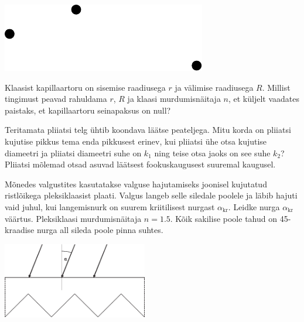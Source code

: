 \documentclass[10pt, twoside]{article}
\begin{document}
{\begin{center}
	\includegraphics[width=0.6\linewidth]{2009-v2g-08-yl}
\end{center}
\probend
\bigskip


Klaasist kapillaartoru on sisemise raadiusega $r$ ja välimise raadiusega $R$. Millist tingimust peavad rahuldama $r$, $R$ ja klaasi murdumisnäitaja $n$, et küljelt vaadates paistaks, et kapillaartoru seinapaksus on null?
\probend
\bigskip


Teritamata pliiatsi telg ühtib koondava läätse peateljega. Mitu korda on pliiatsi kujutise pikkus tema enda pikkusest erinev, kui pliiatsi ühe otsa kujutise diameetri ja pliiatsi diameetri suhe on $k_1$ ning teise otsa jaoks on see suhe $k_2$? Pliiatsi mõlemad otsad asuvad läätsest fookuskaugusest suuremal kaugusel.
\probend
\bigskip


Mõnedes valgustites kasutatakse valguse hajutamiseks joonisel kujutatud ristlõikega
pleksiklaasist plaati. Valgus langeb selle siledale poolele ja läbib hajuti vaid juhul, kui
langemisnurk on suurem kriitilisest nurgast $\alpha_\mathrm{kr}$. Leidke nurga $\alpha_\mathrm{kr}$ väärtus. Pleksiklaasi
murdumisnäitaja $n=\num{1,5}$. Kõik sakilise poole tahud on \num{45}-kraadise nurga all sileda poole pinna
suhtes.
\begin{center}
	\includegraphics[width=0.475\textwidth]{2010-v2g-08-hajuti.eps}
\end{center}
\probend
\bigskip

}
\end{document}
